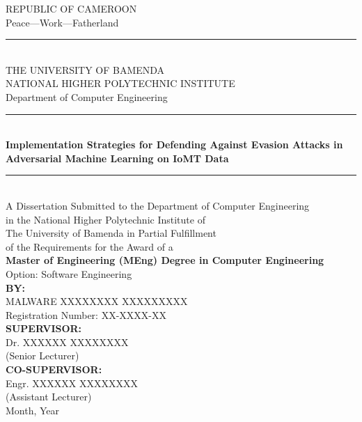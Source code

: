 \documentclass[12pt,a4paper,oneside]{report}
\begin{document}

\thispagestyle{empty}
\begin{center}
    \vspace*{0.5cm}
    {\large REPUBLIC OF CAMEROON}\\[0.2cm]
    {\large Peace---Work---Fatherland}\\[0.5cm]
    \rule{\textwidth}{0.5pt}\\[0.3cm]
    {\Large THE UNIVERSITY OF BAMENDA}\\[0.2cm]
    {\Large NATIONAL HIGHER POLYTECHNIC INSTITUTE}\\[0.2cm]
    {\large Department of Computer Engineering}\\[1.5cm]
    \rule{\textwidth}{0.5pt}\\[0.8cm]
    {\Huge\bfseries Implementation Strategies for Defending Against Evasion Attacks in Adversarial Machine Learning on IoMT Data}\\[1.0cm]
    \rule{\textwidth}{0.5pt}\\[1.0cm]
    {\large A Dissertation Submitted to the Department of Computer Engineering}\\
    {\large in the National Higher Polytechnic Institute of}\\
    {\large The University of Bamenda in Partial Fulfillment}\\
    {\large of the Requirements for the Award of a}\\[0.3cm]
    {\Large\bfseries Master of Engineering (MEng) Degree in Computer Engineering}\\[1.0cm]
    {\large Option: Software Engineering}\\[1.5cm]
    {\large\bfseries BY:}\\[0.3cm]
    {\Large MALWARE XXXXXXXX XXXXXXXXX}\\[0.2cm]
    {\large Registration Number: XX-XXXX-XX}\\[1.5cm]
    {\large\bfseries SUPERVISOR:}\\[0.3cm]
    {\large Dr. XXXXXX XXXXXXXX}\\[0.2cm]
    {\large (Senior Lecturer)}\\[1.5cm]
    {\large\bfseries CO-SUPERVISOR:}\\[0.3cm]
    {\large Engr. XXXXXX XXXXXXXX}\\[0.2cm]
    {\large (Assistant Lecturer)}\\[1.5cm]
    {\large Month, Year}
    \vfill
\end{center}
\newpage
\end{document}
